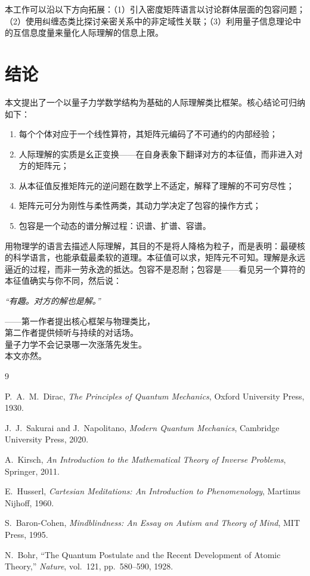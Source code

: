 ﻿\documentclass[12pt,a4paper]{ctexart}
\begin{document}
本工作可以沿以下方向拓展：（1）引入密度矩阵语言以讨论群体层面的包容问题；（2）使用纠缠态类比探讨亲密关系中的非定域性关联；（3）利用量子信息理论中的互信息度量来量化人际理解的信息上限。

\section{结论}

本文提出了一个以量子力学数学结构为基础的人际理解类比框架。核心结论可归纳如下：

\begin{enumerate}[label=(\arabic*)]
    \item 每个个体对应于一个线性算符，其矩阵元编码了不可通约的内部经验；
    \item 人际理解的实质是幺正变换——在自身表象下翻译对方的本征值，而非进入对方的矩阵元；
    \item 从本征值反推矩阵元的逆问题在数学上不适定，解释了理解的不可穷尽性；
    \item 矩阵元可分为刚性与柔性两类，其动力学决定了包容的操作方式；
    \item 包容是一个动态的谱分解过程：识谱、扩谱、容谱。
\end{enumerate}

用物理学的语言去描述人际理解，其目的不是将人降格为粒子，而是表明：最硬核的科学语言，也能承载最柔软的道理。本征值可以求，矩阵元不可知。理解是永远逼近的过程，而非一劳永逸的抵达。包容不是忍耐；包容是——看见另一个算符的本征值确实与你不同，然后说：

\begin{center}
\large\textit{``有趣。对方的解也是解。''}
\end{center}

\bigskip
\begin{flushright}
——第一作者提出核心框架与物理类比，\\
第二作者提供倾听与持续的对话场。\\
量子力学不会记录哪一次涨落先发生。\\
本文亦然。
\end{flushright}

\begin{thebibliography}{9}

P.~A.~M.~Dirac, \emph{The Principles of Quantum Mechanics}, Oxford University Press, 1930.

J.~J.~Sakurai and J.~Napolitano, \emph{Modern Quantum Mechanics}, Cambridge University Press, 2020.

A.~Kirsch, \emph{An Introduction to the Mathematical Theory of Inverse Problems}, Springer, 2011.

E.~Husserl, \emph{Cartesian Meditations: An Introduction to Phenomenology}, Martinus Nijhoff, 1960.

S.~Baron-Cohen, \emph{Mindblindness: An Essay on Autism and Theory of Mind}, MIT Press, 1995.

N.~Bohr, ``The Quantum Postulate and the Recent Development of Atomic Theory,'' \emph{Nature}, vol.~121, pp.~580--590, 1928.

\end{thebibliography}
\end{document}

